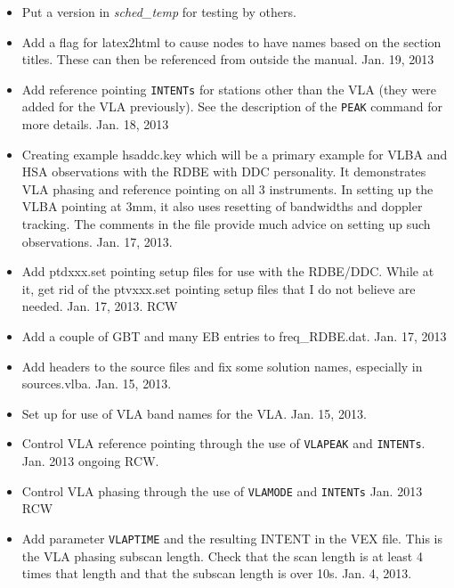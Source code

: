 \documentclass{report}
\begin{document}
\begin{itemize}

\item Put a version in {\sl sched\_temp} for testing by others.

\item Add a flag for latex2html to cause nodes to have names based on the
section titles.  These can then be referenced from outside the manual.
Jan. 19, 2013

\item Add reference pointing {\tt INTENTs} for stations other than the
VLA (they were added for the VLA previously).  See the description
of the {\tt PEAK} command for more details.    Jan. 18, 2013

\item Creating example hsaddc.key which will be a primary example for
VLBA and HSA observations with the RDBE with DDC personality.  It 
demonstrates VLA phasing and reference pointing on all 3 instruments.
In setting up the VLBA pointing at 3mm, it also uses resetting of
bandwidths and doppler tracking.  The comments in the file provide
much advice on setting up such observations.  Jan. 17, 2013.

\item Add ptdxxx.set pointing setup files for use with the RDBE/DDC.
While at it, get rid of the ptvxxx.set pointing setup files that I do not
believe are needed.  Jan. 17, 2013.  RCW

\item Add a couple of GBT and many EB entries to freq\_RDBE.dat.  Jan. 17, 2013

\item Add headers to the source files and fix some solution names, 
especially in sources.vlba.  Jan. 15, 2013.

\item Set up for use of VLA band names for the VLA.  Jan. 15, 2013.

\item Control VLA reference pointing through the use of {\tt VLAPEAK} and 
{\tt INTENTs}.  Jan. 2013 ongoing  RCW.

\item Control VLA phasing through the use of {\tt VLAMODE} and {\tt INTENTs}
Jan. 2013  RCW

\item Add parameter {\tt VLAPTIME} and the resulting INTENT in the VEX file.
This is the VLA phasing subscan length.  Check that the scan length is
at least 4 times that length and that the subscan length is over 10s. 
Jan. 4, 2013.


\end{itemize}
\end{document}
